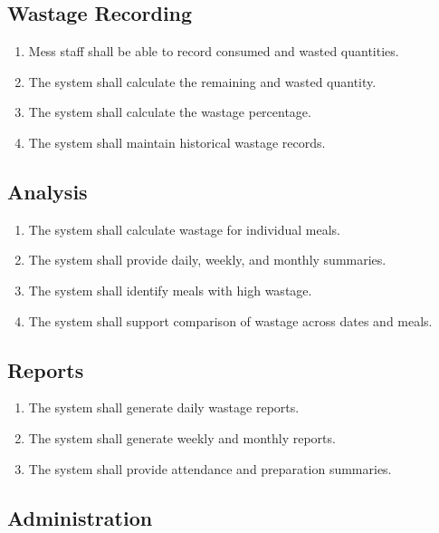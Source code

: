\documentclass[12pt,a4paper]{report}
\begin{document}
	\subsection{Wastage Recording}
	
	\begin{enumerate}[leftmargin=*]
		\item Mess staff shall be able to record consumed and wasted quantities.
		\item The system shall calculate the remaining and wasted quantity.
		\item The system shall calculate the wastage percentage.
		\item The system shall maintain historical wastage records.
	\end{enumerate}
	
	\subsection{Analysis}
	
	\begin{enumerate}[leftmargin=*]
		\item The system shall calculate wastage for individual meals.
		\item The system shall provide daily, weekly, and monthly summaries.
		\item The system shall identify meals with high wastage.
		\item The system shall support comparison of wastage across dates and meals.
	\end{enumerate}
	
	\subsection{Reports}
	
	\begin{enumerate}[leftmargin=*]
		\item The system shall generate daily wastage reports.
		\item The system shall generate weekly and monthly reports.
		\item The system shall provide attendance and preparation summaries.
	\end{enumerate}
	
	\subsection{Administration}
	
\end{document}
